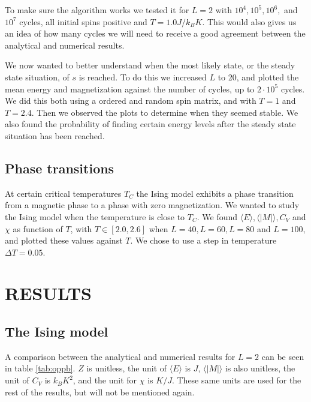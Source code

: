 \documentclass[a4paper]{article}
\let\Oldsection\section
\renewcommand{\section}{\FloatBarrier\Oldsection}
\let\Oldsubsection\subsection
\renewcommand{\subsection}{\FloatBarrier\Oldsubsection}
\begin{document}
To make sure the algorithm works we tested it for $L=2$ with $10^4, 10^5, 10^6,$ and $10^7$ cycles, all initial spins positive and $T = 1.0 J/k_B K$. This would also gives us an idea of how many cycles we will need to receive a good agreement between the analytical and numerical results. 

We now wanted to better understand when the most likely state, or the steady state situation, of $s$ is reached. To do this we increased $L$ to 20, and plotted the mean energy and magnetization against the number of cycles, up to $2\cdot 10^5$ cycles. We did this both using a ordered and random spin matrix, and with $T=1$ and $T=2.4$. Then we observed the plots to determine when they seemed stable. We also found the probability of finding certain energy levels after the steady state situation has been reached.


\subsection{Phase transitions}
At certain critical temperatures $T_C$ the Ising model exhibits a phase transition from a magnetic phase to a phase with zero magnetization. We wanted to study the Ising model when the temperature is close to $T_C$. We found $\langle E \rangle, \langle |M| \rangle, C_V$ and $\chi$ as function of $T$, with $T \in [2.0,2.6]$ when $L = 40 , L = 60 , L = 80$ and $L = 100$, and plotted these values against $T$. We chose to use a step in temperature $\Delta T = 0.05$. 



\section{RESULTS}

\subsection{The Ising model}

A comparison between the analytical and numerical results for $L=2$ can be seen in table \ref{tab:oppb}. $Z$ is unitless, the unit of $\langle E \rangle$ is $J$, $\langle|M|\rangle$ is also unitless, the unit of $C_V$ is $k_B K^2$, and the unit for $\chi$ is $K/J$. These same units are used for the rest of the results, but will not be mentioned again. 
\end{document}
